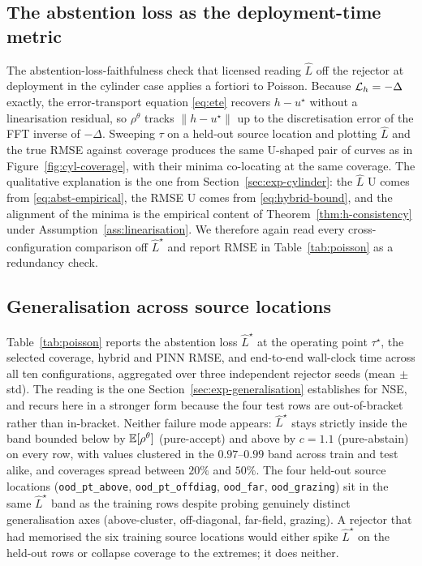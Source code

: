 \subsection{The abstention loss as the deployment-time metric}

The abstention-loss-faithfulness check that licensed reading
$\widehat{L}$ off the rejector at deployment in the cylinder case
applies a fortiori to Poisson. Because $\mathcal{L}_h=-\Delta$ exactly,
the error-transport equation \eqref{eq:ete} recovers $h-u^\star$
without a linearisation residual, so $\rho^\theta$ tracks
$\|h-u^\star\|$ up to the discretisation error of the FFT inverse
of $-\Delta$. Sweeping $\tau$ on a held-out source location and
plotting $\widehat{L}$ and the true RMSE against coverage produces
the same U-shaped pair of curves as in Figure~\ref{fig:cyl-coverage},
with their minima co-locating at the same coverage. The qualitative
explanation is the one from Section~\ref{sec:exp-cylinder}: the
$\widehat{L}$ U comes from \eqref{eq:abst-empirical}, the RMSE U
comes from \eqref{eq:hybrid-bound}, and the alignment of the minima
is the empirical content of Theorem~\ref{thm:h-consistency} under
Assumption~\ref{ass:linearisation}. We therefore again read every
cross-configuration comparison off $\widehat{L}^\star$ and report
$\mathrm{RMSE}$ in Table~\ref{tab:poisson} as a redundancy check.

\subsection{Generalisation across source locations}

Table~\ref{tab:poisson} reports the abstention loss
$\widehat{L}^\star$ at the operating point $\tau^\star$, the
selected coverage, hybrid and PINN RMSE, and end-to-end wall-clock
time across all ten configurations, aggregated over three
independent rejector seeds (mean$\,\pm\,$std). The reading is the
one Section~\ref{sec:exp-generalisation} establishes for NSE, and
recurs here in a stronger form because the four test rows are
out-of-bracket rather than in-bracket. Neither failure mode appears:
$\widehat{L}^\star$ stays strictly inside the band bounded below by
$\mathbb{E}[\rho^\theta]$ (pure-accept) and above by $c=1.1$ (pure-abstain)
on every row, with values clustered in the $0.97\text{--}0.99$ band
across train and test alike, and coverages spread between $20\%$
and $50\%$. The four held-out source locations
(\texttt{ood\_pt\_above}, \texttt{ood\_pt\_offdiag},
\texttt{ood\_far}, \texttt{ood\_grazing}) sit in the same
$\widehat{L}^\star$ band as the training rows despite probing
genuinely distinct generalisation axes (above-cluster,
off-diagonal, far-field, grazing). A rejector that had memorised
the six training source locations would either spike
$\widehat{L}^\star$ on the held-out rows or collapse coverage to
the extremes; it does neither.

